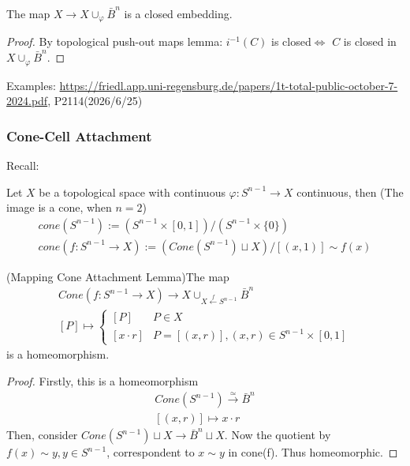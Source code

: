 \documentclass[Total.tex]{subfiles}
\begin{document}
			
			\begin{proposition}
				The map $X\rightarrow X\cup_\varphi \bar{B}^n$ is a closed embedding.
			\end{proposition}
			\begin{proof}
				By topological push-out maps lemma: $i^{-1}(C)$ is closed$\Leftrightarrow$ $C$ is closed in $X\cup_{\varphi} \bar{B}^n$.
			\end{proof}
			
			Examples: \url{https://friedl.app.uni-regensburg.de/papers/1t-total-public-october-7-2024.pdf}, P2114(2026/6/25)
			
			\subsubsection{Cone-Cell Attachment}
			
			Recall:
			\begin{Def}
				Let $X$ be a topological space with continuous $\varphi:S^{n-1}\rightarrow X$ continuous, then (The image is a cone, when $n=2$)
				\begin{gather*}
					cone(S^{n-1}):=(S^{n-1}\times [0,1])/(S^{n-1}\times \{0\})\\
					cone(f:S^{n-1}\rightarrow X):=(Cone(S^{n-1})\sqcup X)/[(x,1)]\sim f(x)
				\end{gather*}
			\end{Def}
			
			\begin{lemma}
				(Mapping Cone Attachment Lemma)The map
				\begin{gather*}
					Cone(f:S^{n-1}\rightarrow X)\rightarrow X\cup_{X\stackrel{f}{\leftarrow} S^{n-1}} \bar{B}^n\\
					[P]\mapsto  \begin{cases}
						[P]&P\in X\\
						[x\cdot r]&P=[(x,r)],(x,r)\in S^{n-1}\times [0,1]
					\end{cases}
				\end{gather*} 
				is a homeomorphism.
			\end{lemma}
			\begin{proof}
				Firstly, this is a homeomorphism
				\begin{gather*}
					Cone(S^{n-1})\stackrel{\simeq}{\rightarrow} \bar{B}^n\\
					[(x,r)]\mapsto x\cdot r
				\end{gather*}
				Then, consider $Cone(S^{n-1})\sqcup X\rightarrow \bar{B}^n\sqcup X$. Now the quotient by $f(x)\sim y,y\in S^{n-1}$, correspondent to $x\sim y$ in cone(f). Thus homeomorphic.
			\end{proof}
\end{document}
